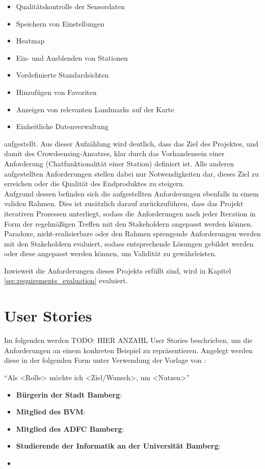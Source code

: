 \begin{itemize}
    \item Qualitätskontrolle der Sensordaten
    \item Speichern von Einstellungen
    \item Heatmap
    \item Ein- und Ausblenden von Stationen
    \item Vordefinierte Standardsichten
    \item Hinzufügen von Favoriten
    \item Anzeigen von relevanten Landmarks auf der Karte
    \item Einheitliche Datenverwaltung
\end{itemize}

aufgestellt. Aus dieser Aufzählung wird deutlich, dass das Ziel des Projektes, und damit des Crowdsensing-Ansatzes, klar durch das Vorhandensein einer Anforderung (Chatfunktionalität einer Station) definiert ist. Alle anderen aufgestellten Anforderungen stellen dabei nur Notwendigkeiten dar, dieses Ziel zu erreichen oder die Qualität des Endproduktes zu steigern. \\ Aufgrund dessen befinden sich die aufgestellten Anforderungen ebenfalls in einem validen Rahmen. Dies ist zusätzlich darauf zurückzuführen, dass das Projekt iterativen Prozessen unterliegt, sodass die Anforderungen nach jeder Iteration in Form der regelmäßigen Treffen mit den Stakeholdern angepasst werden können. Paradoxe, nicht-realisierbare oder den Rahmen sprengende Anforderungen werden mit den Stakeholdern evaluiert, sodass entsprechende Lösungen gebildet werden oder diese angepasst werden können, um Validität zu gewährleisten.

Inwieweit die Anforderungen dieses Projekts erfüllt sind, wird in Kapitel \ref{sec:requirements_evaluation} evaluiert. 

\section{User Stories}
Im folgenden werden TODO: HIER ANZAHL User Stories beschrieben, um die Anforderungen an einem konkreten Beispiel zu repräsentieren. Angelegt werden diese in der folgenden Form unter Verwendung der Vorlage von \cite{AmblerUserStory}:

\enquote{Als <Rolle> möchte ich <Ziel/Wunsch>, um <Nutzen>}

\begin{itemize}
    \item \textbf{Bürgerin der Stadt Bamberg}:
    \item \textbf{Mitglied des \ac{BVM}}:
    \item \textbf{Mitglied des \ac{ADFC} Bamberg}:
    \item \textbf{Studierende der Informatik an der Universität Bamberg}:
    \item 
\end{itemize}

